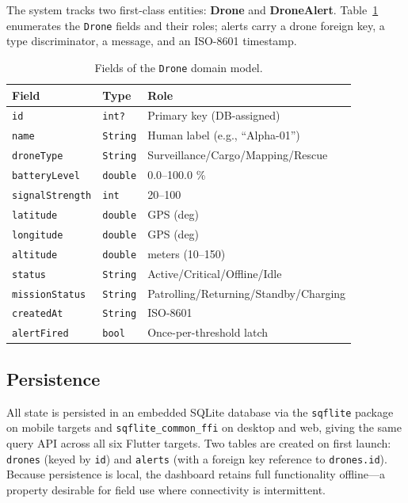 \documentclass[conference]{IEEEtran}
\begin{document}
The system tracks two first-class entities: \textbf{Drone} and \textbf{DroneAlert}. Table~\ref{tab:drone_fields} enumerates the \texttt{Drone} fields and their roles; alerts carry a drone foreign key, a type discriminator, a message, and an ISO-8601 timestamp.

\begin{table}[!t]
\caption{Fields of the \texttt{Drone} domain model.}
\label{tab:drone_fields}
\centering
\footnotesize
\begin{tabular}{@{}lll@{}}
\toprule
\textbf{Field} & \textbf{Type} & \textbf{Role} \\
\midrule
\texttt{id} & \texttt{int?} & Primary key (DB-assigned) \\
\texttt{name} & \texttt{String} & Human label (e.g., ``Alpha-01'') \\
\texttt{droneType} & \texttt{String} & Surveillance/Cargo/Mapping/Rescue \\
\texttt{batteryLevel} & \texttt{double} & 0.0--100.0 \% \\
\texttt{signalStrength} & \texttt{int} & 20--100 \\
\texttt{latitude} & \texttt{double} & GPS (deg) \\
\texttt{longitude} & \texttt{double} & GPS (deg) \\
\texttt{altitude} & \texttt{double} & meters (10--150) \\
\texttt{status} & \texttt{String} & Active/Critical/Offline/Idle \\
\texttt{missionStatus} & \texttt{String} & Patrolling/Returning/Standby/Charging \\
\texttt{createdAt} & \texttt{String} & ISO-8601 \\
\texttt{alertFired} & \texttt{bool} & Once-per-threshold latch \\
\bottomrule
\end{tabular}
\end{table}

\subsection{Persistence}

All state is persisted in an embedded SQLite database via the \texttt{sqflite} package on mobile targets and \texttt{sqflite\_common\_ffi} on desktop and web, giving the same query API across all six Flutter targets. Two tables are created on first launch: \texttt{drones} (keyed by \texttt{id}) and \texttt{alerts} (with a foreign key reference to \texttt{drones.id}). Because persistence is local, the dashboard retains full functionality offline---a property desirable for field use where connectivity is intermittent.
\end{document}

